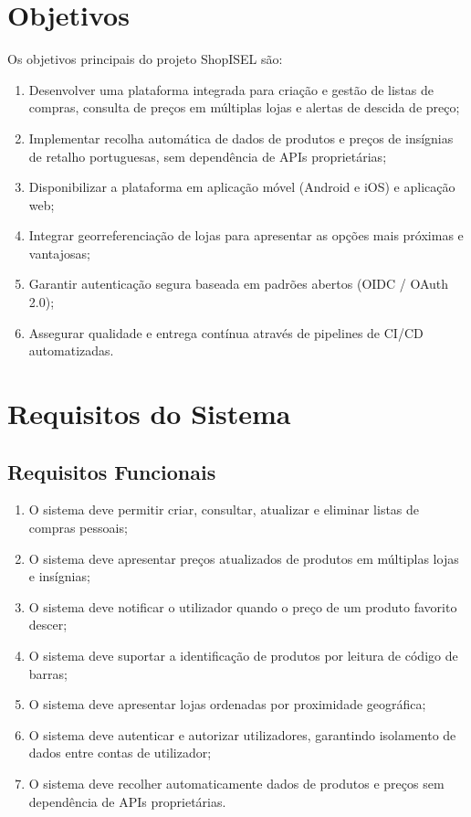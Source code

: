 \section{Objetivos}
\label{sec:1.3}

Os objetivos principais do projeto ShopISEL são:

\begin{enumerate}
    \item Desenvolver uma plataforma integrada para criação e gestão de listas de compras, consulta de preços em múltiplas lojas e alertas de descida de preço;
    \item Implementar recolha automática de dados de produtos e preços de insígnias de retalho portuguesas, sem dependência de \ac{API}s proprietárias;
    \item Disponibilizar a plataforma em aplicação móvel (Android e iOS) e aplicação web;
    \item Integrar georreferenciação de lojas para apresentar as opções mais próximas e vantajosas;
    \item Garantir autenticação segura baseada em padrões abertos (\ac{OIDC} / OAuth 2.0);
    \item Assegurar qualidade e entrega contínua através de pipelines de \ac{CI/CD} automatizadas.
\end{enumerate}

\section{Requisitos do Sistema}
\label{sec:1.4}

\subsection{Requisitos Funcionais}
\label{sec:1.4.1}

\begin{enumerate}
    \item O sistema deve permitir criar, consultar, atualizar e eliminar listas de compras pessoais;
    \item O sistema deve apresentar preços atualizados de produtos em múltiplas lojas e insígnias;
    \item O sistema deve notificar o utilizador quando o preço de um produto favorito descer;
    \item O sistema deve suportar a identificação de produtos por leitura de código de barras;
    \item O sistema deve apresentar lojas ordenadas por proximidade geográfica;
    \item O sistema deve autenticar e autorizar utilizadores, garantindo isolamento de dados entre contas de utilizador;
    \item O sistema deve recolher automaticamente dados de produtos e preços sem dependência de \ac{API}s proprietárias.
\end{enumerate}

